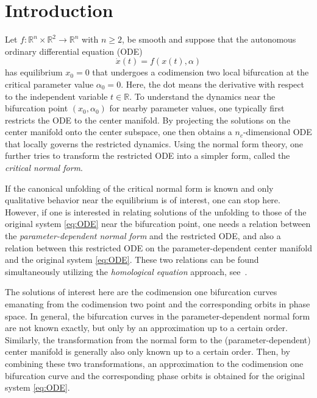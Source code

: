 \section{Introduction} 
Let $f\colon\mathbb R^n \times \mathbb R^2 \to \mathbb R^n$ with $n\geq 2$, be
smooth and suppose that the autonomous ordinary differential equation (ODE)
\begin{equation}
    \label{eq:ODE}
    \dot x(t) = f(x(t),\alpha)
\end{equation}
has equilibrium  $x_0= 0$ that undergoes a codimension two local bifurcation at
the critical parameter value $\alpha_{0}=0$. Here, the dot means the derivative
with respect to the independent variable $t\in\mathbb R$. To understand the
dynamics near the bifurcation point $(x_0,\alpha_0)$ for nearby parameter
values, one typically first restricts the ODE to the center manifold. By
projecting the solutions on the center manifold onto the center subspace, one
then obtains a $n_c$-dimensional ODE that locally governs the restricted
dynamics.  Using the normal form theory, one further tries to transform the
restricted ODE into a simpler form, called the \emph{critical normal form}.

If the canonical unfolding of the critical normal form is known and only
qua\-li\-tative behavior near the equilibrium is of interest, one can stop
here. However, if one is interested in relating solutions of the unfolding to
those of the original system \cref{eq:ODE} near the bifurcation point, one
needs a relation between the \emph{parameter-dependent normal form} and the
restricted ODE, and also a relation between this restricted ODE on the
parameter-dependent center manifold and the original system \cref{eq:ODE}.
These two relations can be found simultaneously utilizing the \emph{homological
equation} approach, see~\cite{Beyn2002149}. 

The solutions of interest here are the codimension one bifurcation curves
emanating from the codimension two point and the corresponding orbits in phase
space. In general, the bifurcation curves in the 
parameter-dependent normal form are not known exactly, but only by an
approximation up to a certain order.  Si\-mi\-lar\-ly, the transformation
from the normal form to the (parameter-dependent) center manifold is
generally also only known up to a certain order. Then, by combining these two
transformations, an approximation to the codimension one bifurcation curve and
the corresponding phase orbits is obtained for the original system
\cref{eq:ODE}.


